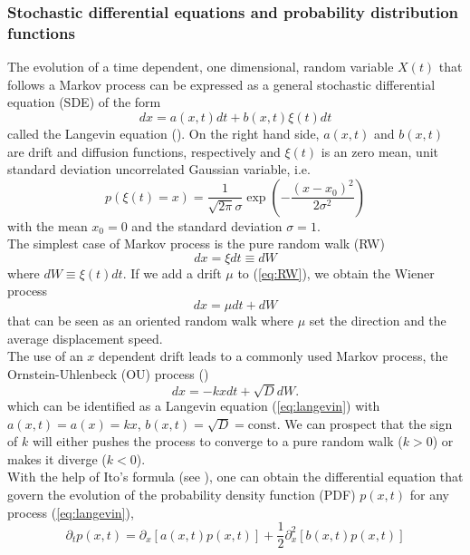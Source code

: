 \subsubsection{Stochastic differential equations and probability distribution functions}
The evolution of a time dependent, one dimensional, random variable $X(t)$ that follows a Markov process can be expressed as a general stochastic differential equation (SDE) of the form
\begin{equation}
	dx = a(x,t)dt + b(x,t)\xi(t)dt
	\label{eq:langevin}
\end{equation}
called the Langevin equation (\citet[Eq. 4.1.1]{Gardiner1996}). 
On the right hand side, $a(x,t)$ and $b(x,t)$ are drift and diffusion functions, respectively and $\xi(t)$ is an zero mean, unit standard deviation uncorrelated Gaussian variable, i.e.
\[
p(\xi(t)=x)=\frac{1}{\sqrt{2\pi}\sigma}\exp(-\frac{(x-x_0)^2}{2\sigma^2})
\]
with the mean $x_0=0$ and the standard deviation $\sigma=1$.\\
The simplest case of Markov process is the pure random walk (RW)
\begin{equation}\label{eq:RW}
	dx = \xi dt \equiv dW
\end{equation}
where $dW\equiv\xi(t)dt$.
If we add a drift $\mu$ to (\ref{eq:RW}), we obtain the Wiener process
\begin{equation}\label{eq:wiener}
dx = \mu dt + dW
\end{equation}
that can be seen as an oriented random walk where $\mu$ set the direction and the average displacement speed.\\
The use of an $x$ dependent drift leads to a commonly used Markov process, the Ornstein-Uhlenbeck (OU) process (\citet[Sec. 3.8.4]{Gardiner1996})
\begin{equation}
dx = -kxdt + \sqrt{D}dW.
\label{eq:OU}
\end{equation}
which can be identified as a Langevin equation (\ref{eq:langevin}) with $a(x,t)=a(x)=kx$, $b(x,t)=\sqrt{D}=\mathrm{const}$. We can prospect that the sign of $k$ will either pushes the process to converge to a pure random walk ($k>0$) or makes it diverge ($k<0$).\\
With the help of Ito's formula (see \citet[Sec. 4.3.4]{Gardiner1996}), one can obtain the differential equation that govern the evolution of the probability density function (PDF) $p(x,t)$ for any process (\ref{eq:langevin}),
\begin{equation}
\partial_t p(x,t) = \partial_x[a(x,t)p(x,t)] + \frac{1}{2}\partial^2_x [b(x,t)p(x,t)]
\label{eq:fokkerplanck} 
\end{equation}
